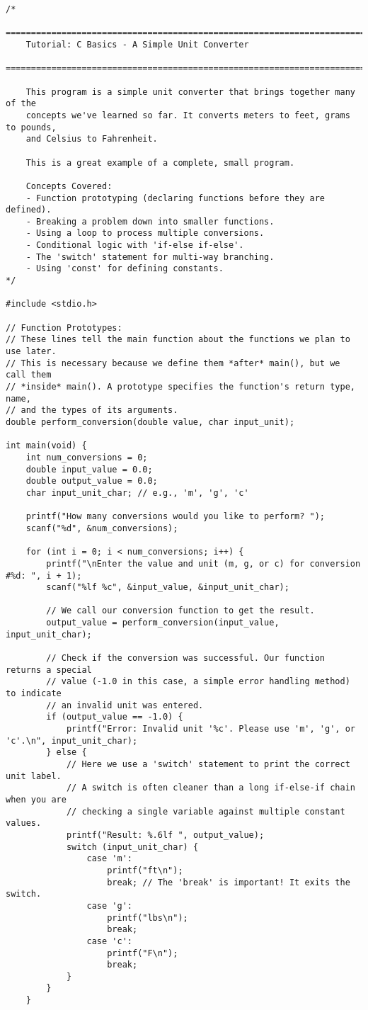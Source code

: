 \documentclass[11pt]{book}
\begin{document}
\begin{verbatim}
/*
    ================================================================================
    Tutorial: C Basics - A Simple Unit Converter
    ================================================================================

    This program is a simple unit converter that brings together many of the
    concepts we've learned so far. It converts meters to feet, grams to pounds,
    and Celsius to Fahrenheit.

    This is a great example of a complete, small program.

    Concepts Covered:
    - Function prototyping (declaring functions before they are defined).
    - Breaking a problem down into smaller functions.
    - Using a loop to process multiple conversions.
    - Conditional logic with 'if-else if-else'.
    - The 'switch' statement for multi-way branching.
    - Using 'const' for defining constants.
*/

#include <stdio.h>

// Function Prototypes:
// These lines tell the main function about the functions we plan to use later.
// This is necessary because we define them *after* main(), but we call them
// *inside* main(). A prototype specifies the function's return type, name,
// and the types of its arguments.
double perform_conversion(double value, char input_unit);

int main(void) {
    int num_conversions = 0;
    double input_value = 0.0;
    double output_value = 0.0;
    char input_unit_char; // e.g., 'm', 'g', 'c'

    printf("How many conversions would you like to perform? ");
    scanf("%d", &num_conversions);

    for (int i = 0; i < num_conversions; i++) {
        printf("\nEnter the value and unit (m, g, or c) for conversion #%d: ", i + 1);
        scanf("%lf %c", &input_value, &input_unit_char);

        // We call our conversion function to get the result.
        output_value = perform_conversion(input_value, input_unit_char);

        // Check if the conversion was successful. Our function returns a special
        // value (-1.0 in this case, a simple error handling method) to indicate
        // an invalid unit was entered.
        if (output_value == -1.0) {
            printf("Error: Invalid unit '%c'. Please use 'm', 'g', or 'c'.\n", input_unit_char);
        } else {
            // Here we use a 'switch' statement to print the correct unit label.
            // A switch is often cleaner than a long if-else-if chain when you are
            // checking a single variable against multiple constant values.
            printf("Result: %.6lf ", output_value);
            switch (input_unit_char) {
                case 'm':
                    printf("ft\n");
                    break; // The 'break' is important! It exits the switch.
                case 'g':
                    printf("lbs\n");
                    break;
                case 'c':
                    printf("F\n");
                    break;
            }
        }
    }


\end{verbatim}
\end{document}
